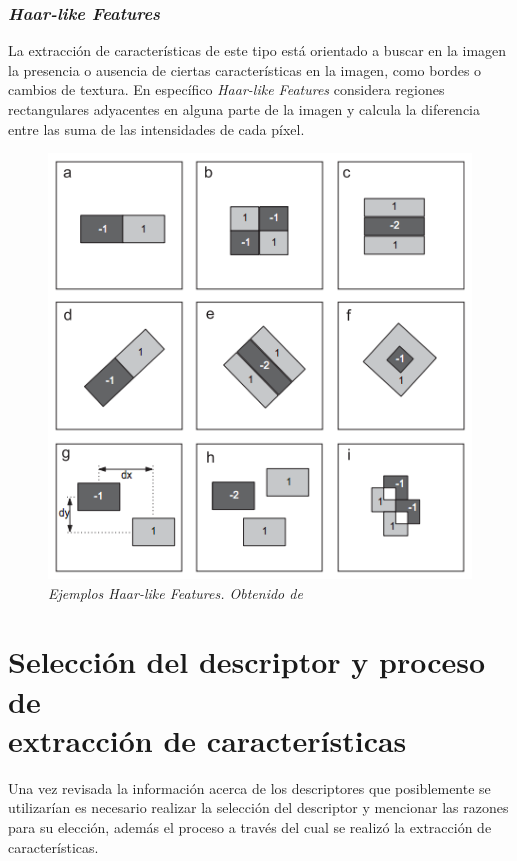 \subsubsection{\textit{Haar-like Features}}

La extracción de características de este tipo está orientado a buscar en la imagen la presencia o ausencia de ciertas características en la imagen, como bordes o cambios de textura. En específico \textit{Haar-like Features} considera regiones rectangulares adyacentes en alguna parte de la imagen y calcula la diferencia entre las suma de las intensidades de cada píxel.

\begin{figure}[htc]
  \centering
  \includegraphics[scale=.3]{images/haarlike}
  \caption{\em Ejemplos \textit{Haar-like Features}. Obtenido de \cite{Pavani2010} }  
  \label{fig:haar}
\end{figure}

\section{Selección del descriptor y proceso de \\extracción de características}
\label{caract:seleccion}

Una vez revisada la información acerca de los descriptores que posiblemente se utilizarían es necesario realizar la selección del descriptor y mencionar las razones para su elección, además el proceso a través del cual se realizó la extracción de características.

